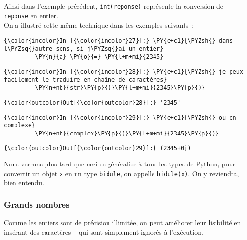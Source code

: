 Ainsi dans l'exemple précédent, \texttt{int(reponse)} représente la
conversion de \texttt{reponse} en entier.\\

On a illustré cette même technique dans les exemples suivants~:

    \begin{Verbatim}[commandchars=\\\{\}]
{\color{incolor}In [{\color{incolor}27}]:} \PY{c+c1}{\PYZsh{} dans l\PYZsq{}autre sens, si j\PYZsq{}ai un entier}
         \PY{n}{a} \PY{o}{=} \PY{l+m+mi}{2345}
\end{Verbatim}


    \begin{Verbatim}[commandchars=\\\{\}]
{\color{incolor}In [{\color{incolor}28}]:} \PY{c+c1}{\PYZsh{} je peux facilement le traduire en chaîne de caractères}
         \PY{n+nb}{str}\PY{p}{(}\PY{l+m+mi}{2345}\PY{p}{)}
\end{Verbatim}


\begin{Verbatim}[commandchars=\\\{\}]
{\color{outcolor}Out[{\color{outcolor}28}]:} '2345'
\end{Verbatim}
            
    \begin{Verbatim}[commandchars=\\\{\}]
{\color{incolor}In [{\color{incolor}29}]:} \PY{c+c1}{\PYZsh{} ou en complexe}
         \PY{n+nb}{complex}\PY{p}{(}\PY{l+m+mi}{2345}\PY{p}{)}
\end{Verbatim}


\begin{Verbatim}[commandchars=\\\{\}]
{\color{outcolor}Out[{\color{outcolor}29}]:} (2345+0j)
\end{Verbatim}
            
    Nous verrons plus tard que ceci se généralise à tous les types de
Python, pour convertir un objet \texttt{x} en un type \texttt{bidule},
on appelle \texttt{bidule(x)}. On y reviendra, bien entendu.

    \hypertarget{grands-nombres}{%
\subsubsection{Grands nombres}\label{grands-nombres}}

    Comme les entiers sont de précision illimitée, on peut améliorer leur
lisibilité en insérant des caractères \texttt{\_} qui sont simplement
ignorés à l'exécution.

